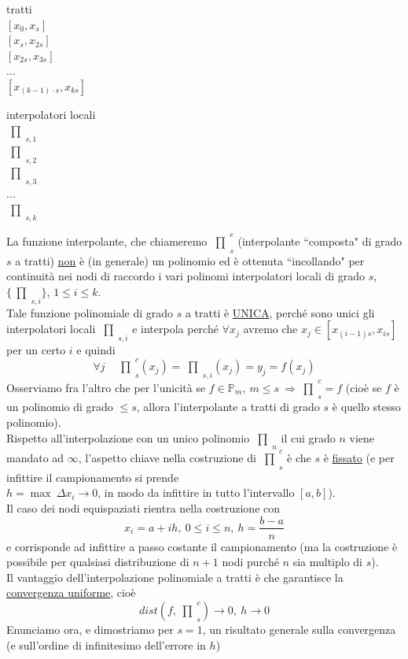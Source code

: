 \documentclass[12pt,a4paper]{article}
\newcommand{\inter}{\begin{matrix}\prod\end{matrix}}
\begin{document}
\begin{minipage}{0.33\textwidth}
\begin{center}
    tratti\\
    $[x_0, x_s]$\\
    $[x_s, x_{2s}]$\\
    $[x_{2s}, x_{3s}]$\\
    $\dotso$\\
    $[x_{(k-1) \cdot s}, x_{ks}]$
\end{center}
\end{minipage}
\begin{minipage}{0.33\textwidth}
\begin{center}
    interpolatori locali\\
    $\inter_{s,1}$\\
    $\inter_{s,2}$\\
    $\inter_{s,3}$\\
    $\dotso$\\
    $\inter_{s,k}$
\end{center}
\end{minipage}

\bigskip
La funzione interpolante, che chiameremo $\inter_s^c$ (interpolante ``composta" di grado $s$ a tratti) \uline{non} è (in generale) un polinomio ed è ottenuta ``incollando" per continuità nei nodi di raccordo i vari polinomi interpolatori locali di grado $s$, $\{ \inter_{s, i}\}$, $1 \leq i \leq k$.\\
Tale funzione polinomiale di grado $s$ a tratti è \uline{UNICA}, perché sono unici gli interpolatori locali $\inter_{s,i}$ e interpola perché $\forall x_j$ avremo che $x_j \in [x_{(i-1) s}, x_{i s}]$ per un certo $i$ e quindi
\[ \forall j \quad \inter_s^c (x_j) = \inter_{s,i} (x_j) = y_j = f(x_j) \]
Osserviamo fra l'altro che per l'unicità se $f \in \mathbb{P}_m, \ m \leq s \ \Rightarrow \inter_s^c = f$ (cioè se $f$ è un polinomio di grado $\leq s$, allora l'interpolante a tratti di grado $s$ è quello stesso polinomio).\\
Rispetto all'interpolazione con un unico polinomio $\inter_n$ il cui grado $n$ viene mandato ad $\infty$, l'aspetto chiave nella costruzione di $\inter_s^c$ è che $s$ è \uline{fissato} (e per infittire il campionamento si prende\\
$h=\max \ \Delta x_i \to 0$, in modo da infittire in tutto l'intervallo $[a,b]$).\\
Il caso dei nodi equispaziati rientra nella costruzione con
\[ x_i = a+ih, \ 0 \leq i \leq n, \ h = \frac{b-a}{n} \]
e corrisponde ad infittire a passo costante il campionamento (ma la costruzione è possibile per qualsiasi distribuzione di $n+1$ nodi purché $n$ sia multiplo di $s$).\\
Il vantaggio dell'interpolazione polinomiale a tratti è che garantisce la \uline{convergenza uniforme}, cioè 
\[ dist(f, \inter_{s}^{c}) \to 0, \ h \to 0 \]
Enunciamo ora, e dimostriamo per $s=1$, un risultato generale sulla convergenza (e sull'ordine
di infinitesimo dell'errore in $h$)
\end{document}
